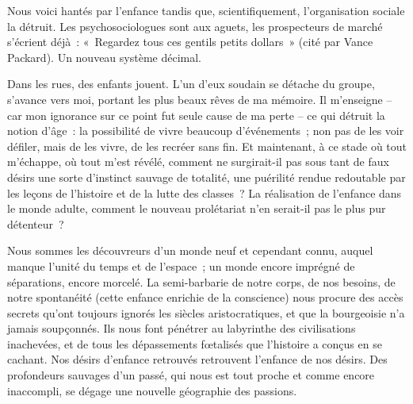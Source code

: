 \documentclass[french,twoside]{book} %
\begin{document}
Nous voici hantés par l’enfance tandis que, scientifiquement, l’organisation sociale la détruit. Les psychosociologues sont aux aguets, les prospecteurs de marché s’écrient déjà : « Regardez tous ces gentils petits dollars » (cité par Vance Packard). Un nouveau système décimal.\par
Dans les rues, des enfants jouent. L’un d’eux soudain se détache du groupe, s’avance vers moi, portant les plus beaux rêves de ma mémoire. Il m’enseigne – car mon ignorance sur ce point fut seule cause de ma perte – ce qui détruit la notion d’âge : la possibilité de vivre beaucoup d’événements ; non pas de les voir défiler, mais de les vivre, de les recréer sans fin. Et maintenant, à ce stade où tout m’échappe, où tout m’est révélé, comment ne surgirait-il pas sous tant de faux désirs une sorte d’instinct sauvage de totalité, une puérilité rendue redoutable par les leçons de l’histoire et de la lutte des classes ? La réalisation de l’enfance dans le monde adulte, comment le nouveau prolétariat n’en serait-il pas le plus pur détenteur ?\par
Nous sommes les découvreurs d’un monde neuf et cependant connu, auquel manque l’unité du temps et de l’espace ; un monde encore imprégné de séparations, encore morcelé. La semi-barbarie de notre corps, de nos besoins, de notre spontanéité (cette enfance enrichie de la conscience) nous procure des accès secrets qu’ont toujours ignorés les siècles aristocratiques, et que la bourgeoisie n’a jamais soupçonnés. Ils nous font pénétrer au labyrinthe des civilisations inachevées, et de tous les dépassements fœtalisés que l’histoire a conçus en se cachant. Nos désirs d’enfance retrouvés retrouvent l’enfance de nos désirs. Des profondeurs sauvages d’un passé, qui nous est tout proche et comme encore inaccompli, se dégage une nouvelle géographie des passions.
\end{document}
